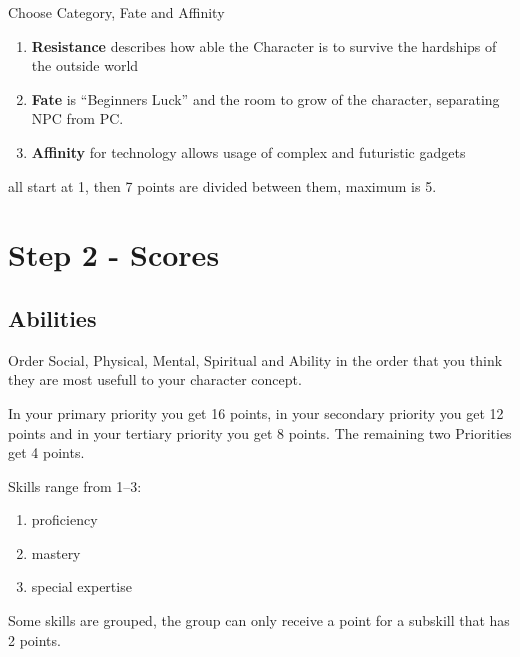 \documentclass[a4paper]{book}
\begin{document}
    Choose Category, Fate and Affinity\par
    \begin{enumerate}
        \item \textbf{Resistance} describes how able the Character is to survive the hardships of the outside world
        \item \textbf{Fate} is ``Beginners Luck'' and the room to grow of the character, separating NPC from PC\@.
        \item \textbf{Affinity} for technology allows usage of complex and futuristic gadgets
    \end{enumerate}
    all start at 1, then 7 points are divided between them, maximum is 5.

    \section{Step 2 - Scores}\label{sec:step2-scores}
    \subsection{Abilities}\label{subsec:abilities}
    Order Social, Physical, Mental, Spiritual and Ability in the order that you think they are most
    usefull to your character concept. \par
    In your primary priority you get 16 points, in your secondary priority you get 12 points and in your tertiary
    priority you get 8 points.
    The remaining two Priorities get 4 points.\par
    Skills range from 1--3:
    \begin{enumerate}
        \item proficiency
        \item mastery
        \item special expertise
    \end{enumerate}
    Some skills are grouped, the group can only receive a point for a subskill that has 2 points.
\end{document}
